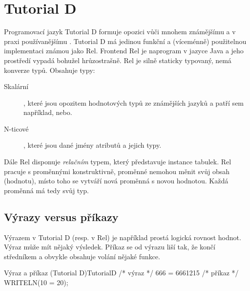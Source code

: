 \section{Tutorial D}
Programovací jazyk Tutorial D formuje opozici vůči mnohem známějšímu a v praxi používanějšímu . Tutorial D má jedinou funkční a (víceménně) použitelnou implementaci známou jako Rel. Frontend Rel je naprogram v jazyce Java a jeho prostředí vypadá bohužel hrůzostrašně. Rel je silně staticky typovaný, nemá konverze typů. Obsahuje typy:
\begin{description}
\item[Skalární], které jsou opozitem hodnotových typů ze známějších jazyků a patří sem například, nebo.
\item[N-ticové], které jsou dané jmény atributů a jejich typy.
\end{description}
Dále Rel disponuje \textit{relačním} typem, který představuje instance tabulek. Rel pracuje s proměnnými konstruktivně, proměnné nemohou měnit svůj obsah (hodnotu), místo toho se vytváří nová proměnná s novou hodnotou. Každá proměnná má tedy svůj typ.

\subsection{Výrazy versus příkazy}
Výrazem v Tutorial D (resp. v Rel) je například prostá logická rovnost hodnot. Výraz může mít nějaký výsledek. Příkaz se od výrazu liší tak, že končí středníkem a obvykle obsahuje volání nějaké funkce.
\begin{upcode}{Výraz a příkaz (Tutorial D)}{}{TutorialD}
/* výraz */
666 = 6661215
/* příkaz */
WRITELN(10 = 20);
\end{upcode}

